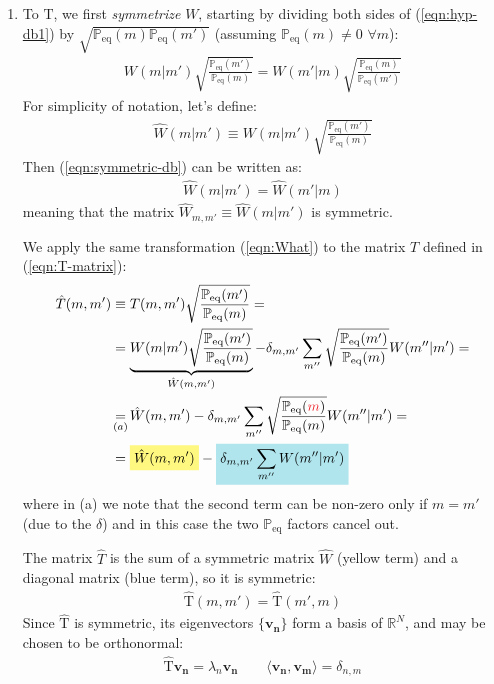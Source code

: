 \documentclass[../../main.tex]{subfiles}
\begin{document}
\begin{enumerate}
    \item To  $\mathrm{T}$, we first \textit{symmetrize} $W$, starting by dividing both sides of (\ref{eqn:hyp-db1}) by $\sqrt{\mathbb{P}_{\mathrm{eq}}(m) \mathbb{P}_{\mathrm{eq}}(m')}$ (assuming $\mathbb{P}_{\mathrm{eq}}(m) \neq 0$ $\forall m$):
    \begin{align}\label{eqn:symmetric-db}
        W(m|m') \sqrt{\frac{\mathbb{P}_{\mathrm{eq}}(m')}{\mathbb{P}_{\mathrm{eq}}(m)}} = W(m'|m) \sqrt{\frac{\mathbb{P}_{\mathrm{eq}}(m)}{\mathbb{P}_{\mathrm{eq}}(m')} }
    \end{align}
    For simplicity of notation, let's define:
    \begin{align}\label{eqn:What}
        \hat{W}(m|m') \equiv W(m|m') \sqrt{\frac{\mathbb{P}_{\mathrm{eq}}(m')}{\mathbb{P}_{\mathrm{eq}}(m)} }
    \end{align}
    Then (\ref{eqn:symmetric-db}) can be written as:
    \begin{align*}
        \hat{W}(m|m') = \hat{W}(m'|m)
    \end{align*}
    meaning that the matrix $\hat{W}_{m,m'} \equiv \hat{W}(m|m')$ is symmetric.
    
    \medskip
    
    We apply the same transformation (\ref{eqn:What}) to the matrix $T$ defined in (\ref{eqn:T-matrix}):
    \begin{align} \label{eqn:That}
        \hat{T}(m,m') &\equiv T(m,m') \sqrt{\frac{\mathbb{P}_{\mathrm{eq}}(m')}{\mathbb{P}_{\mathrm{eq}}(m)}} =\\
        \nonumber
        &= \underbrace{W(m|m') \sqrt{\frac{\mathbb{P}_{\mathrm{eq}}(m')}{\mathbb{P}_{\mathrm{eq}}(m)}}}_{\hat{W}(m,m')} - \delta_{m,m'} \sum_{m''} \sqrt{\frac{\mathbb{P}_{\mathrm{eq}}(m')}{\mathbb{P}_{\mathrm{eq}}(m)}} W(m''|m') = \\ \nonumber
        &\underset{\mathclap{(a)}}{=} \hat{W}(m,m') - \delta_{m,m'} \sum_{m''} \sqrt{\frac{\mathbb{P}_{\mathrm{eq}}(\textcolor{Red}{m})}{\mathbb{P}_{\mathrm{eq}}(m)} } W(m''|m') =\\ \nonumber
        &= \hlc{Yellow}{\hat{W}(m,m') }- \hlc{SkyBlue}{\delta_{m,m'} \sum_{m''} W(m''|m')}
    \end{align}
    where in (a) we note that the second term can be non-zero only if $m = m'$ (due to the $\delta$) and in this case the two $\mathbb{P}_{\mathrm{eq}}$ factors cancel out.
    
    The matrix $\hat{T}$ is the sum of a symmetric matrix $\hat{W}$ (yellow term) and a diagonal matrix (blue term), so it is symmetric:
    \begin{align*}
        \hat{\mathrm{T}}(m,m') = \hat{\mathrm{T}}(m',m)
    \end{align*}
    Since $\hat{\mathrm{T}}$ is symmetric, its eigenvectors $\{\bm{v_n}\}$ form a basis of $\mathbb{R}^N$, and may be chosen to be orthonormal:
    \begin{align*}
        \hat{\mathrm{T}} \bm{v_n} = \lambda_n \bm{v_n} \qquad \langle \bm{v_n}, \bm{v_m} \rangle = \delta_{n,m}
    \end{align*}


\end{enumerate}
\end{document}
